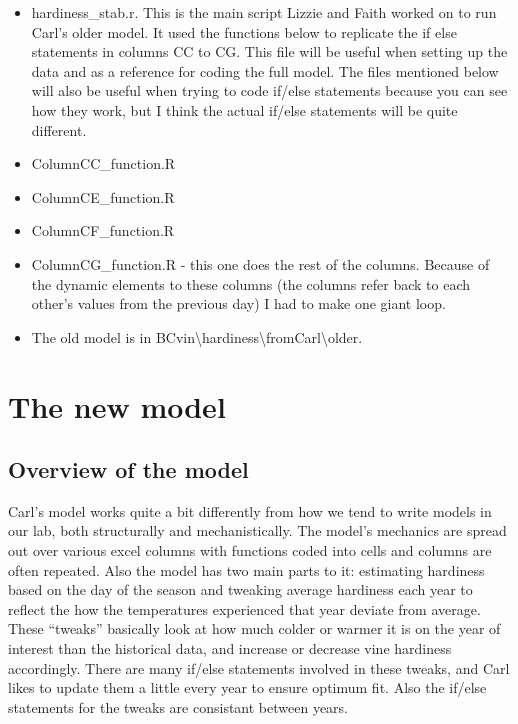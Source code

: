 \documentclass[11pt,letter]{article}
\begin{document}
\begin{itemize} 
	\item hardiness\_stab.r. This is the main script Lizzie and Faith worked on to run Carl's older model. It used the functions below to replicate the if else statements in columns CC to CG. This file will be useful when setting up the data and as a reference for coding the full model. The files mentioned below will also be useful when trying to code if/else statements because you can see how they work, but I think the actual if/else statements will be quite different.     

	\item ColumnCC\_function.R
	\item ColumnCE\_function.R
	\item ColumnCF\_function.R
	\item ColumnCG\_function.R - this one does the rest of the columns. Because of the dynamic elements to these columns (the columns refer back to each other's values from the previous day) I had to make one giant loop.

	\item The old model is in BCvin\textbackslash hardiness\textbackslash fromCarl\textbackslash older.
\end{itemize}

\section{The new model}

\subsection{Overview of the model}
Carl's model works quite a bit differently from how we tend to write models in our lab, both structurally and mechanistically. The model's mechanics are spread out over various excel columns with functions coded into cells and columns are often repeated. Also the model has two main parts to it: estimating hardiness based on the day of the season and tweaking average hardiness each year to reflect the how the temperatures experienced that year deviate from average. These ``tweaks'' basically look at how much colder or warmer it is on the year of interest than the historical data, and increase or decrease vine hardiness accordingly. There are many if/else statements involved in these tweaks, and Carl likes to update them a little every year to ensure optimum fit. Also the if/else statements for the tweaks are consistant between years.  
\end{document}
